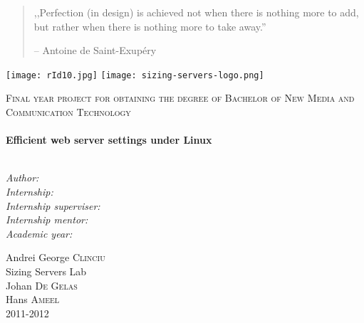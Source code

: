 \begin{titlepage}

\begin{quote}
,,Perfection (in design) is achieved not when there is nothing more
to add, but rather when there is nothing more to take away.''

-- Antoine de Saint-Exupéry
\end{quote}
\texttt{[image: rId10.jpg]}   
\texttt{[image: sizing-servers-logo.png]}   

\textsc{\Large Final year project for obtaining the degree of Bachelor of New Media and Communication Technology}\\[0.5cm]
\HRule \\[0.4cm]
{ \huge \bfseries Efficient web server settings under Linux}\\[0.7cm]
\HRule \\[1.5cm]

\begin{minipage}{0.4\textwidth}
\begin{flushright} \large{}
\emph{Author:}\\
\emph{Internship:} \\
\emph{Internship superviser:} \\
\emph{Internship mentor:} \\
\emph{Academic year:}\\
\end{flushright}
\end{minipage}
\unskip{   }
\begin{minipage}{0.7\textwidth}
\begin{flushleft}
Andrei George \textsc{Clinciu}\\
Sizing Servers Lab\\
Johan  \textsc{De Gelas}\\
Hans  \textsc{Ameel}\\
2011-2012
\end{flushleft}
\end{minipage}

\end{titlepage}
